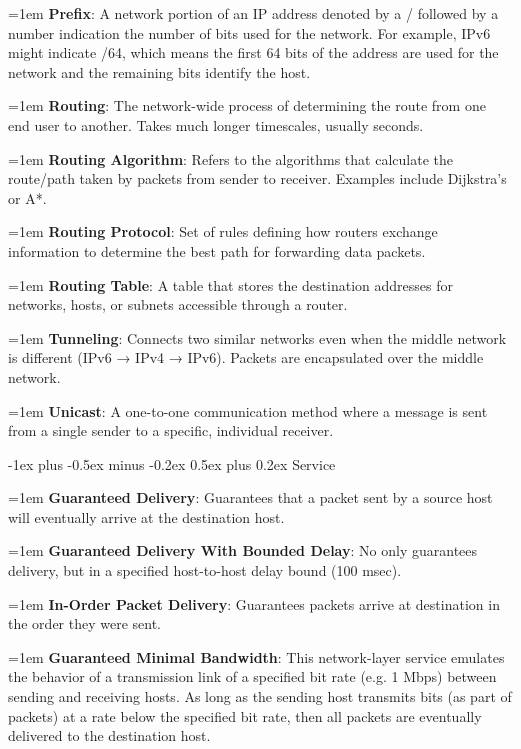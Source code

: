 \documentclass[letterpaper,8pt]{extarticle}
\makeatletter
\newcommand{\definition}[2]{
  \hangindent=1em
  \textbf{#1}: #2%
}
\renewcommand{\subsection}{\@startsection{subsection}{2}{0mm}%
  {-1ex plus -0.5ex minus -0.2ex}%
  {0.5ex plus 0.2ex}%
{\color{h2}\normalfont\fontsize{6}{6}\selectfont\bfseries}}
\makeatother
\begin{document}
\begin{multicols*}{5}
  \definition{Prefix}{A network portion of an IP address denoted by a / followed by a number indication the number of bits used for the network. For example, IPv6 might indicate /64, which means the first 64 bits of the address are used for the network and the remaining bits identify the host.}
  
  \definition{Routing}{The network-wide process of determining the route from one end user to another. Takes much longer timescales, usually seconds.}
  
  \definition{Routing Algorithm}{Refers to the algorithms that calculate the route/path taken by packets from sender to receiver. Examples include Dijkstra's or A*.}
  
  \definition{Routing Protocol}{Set of rules defining how routers exchange information to determine the best path for forwarding data packets.}
  
  \definition{Routing Table}{A table that stores the destination addresses for networks, hosts, or subnets accessible through a router.}
  
  \definition{Tunneling}{Connects two similar networks even when the middle network is different (IPv6 → IPv4 → IPv6). Packets are encapsulated over the middle network.}
  
  \definition{Unicast}{A one-to-one communication method where a message is sent from a single sender to a specific, individual receiver.}
  
  \subsection{Service}
  
  \definition{Guaranteed Delivery}{Guarantees that a packet sent by a source host will eventually arrive at the destination host.}
  
  \definition{Guaranteed Delivery With Bounded Delay}{No only guarantees delivery, but in a specified host-to-host delay bound (100 msec).}
  
  \definition{In-Order Packet Delivery}{Guarantees packets arrive at destination in the order they were sent.}
  
  \definition{Guaranteed Minimal Bandwidth}{This network-layer service emulates the behavior of a transmission link of a specified bit rate (e.g. 1 Mbps) between sending and receiving hosts. As long as the sending host transmits bits (as part of packets) at a rate below the specified bit rate, then all packets are eventually delivered to the destination host.}
  

\end{multicols*}
\end{document}
